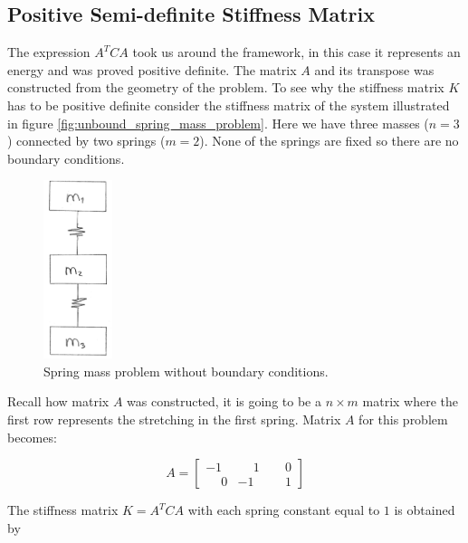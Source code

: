 \subsection{Positive Semi-definite Stiffness Matrix}
The expression $A^T C A$ took us around the framework, in this
case it represents an
energy and was proved positive definite. The matrix $A$ and its
transpose was constructed from the geometry of the problem. To see why
the stiffness matrix $K$ has to be positive 
definite consider the stiffness matrix of the system illustrated in 
figure \vref{fig:unbound_spring_mass_problem}. Here we have three masses
($n=3$) connected by two springs ($m=2$). None of the springs are
fixed so there are no boundary conditions. 

\begin{figure}
  \centering
  \includegraphics[width=2cm]{./images/equilibrium_framework_unbound_spring_mass_problem.png}
\caption{Spring mass problem without boundary conditions.}
\label{fig:unbound_spring_mass_problem}
\end{figure}
 
Recall how matrix $A$ was constructed, it is going to be a $n \times m$
matrix where the first
row represents the stretching in the first spring.
Matrix $A$ for this problem becomes:

\begin{equation*}
A =
\begin{bmatrix}
           -1 & \phantom{-}1 & \phantom{-}0 \\
 \phantom{-}0 &           -1 & \phantom{-}1 
\end{bmatrix}
\end{equation*}

The stiffness matrix $K = A^T C A$ with each spring constant
equal to $1$ is obtained by

